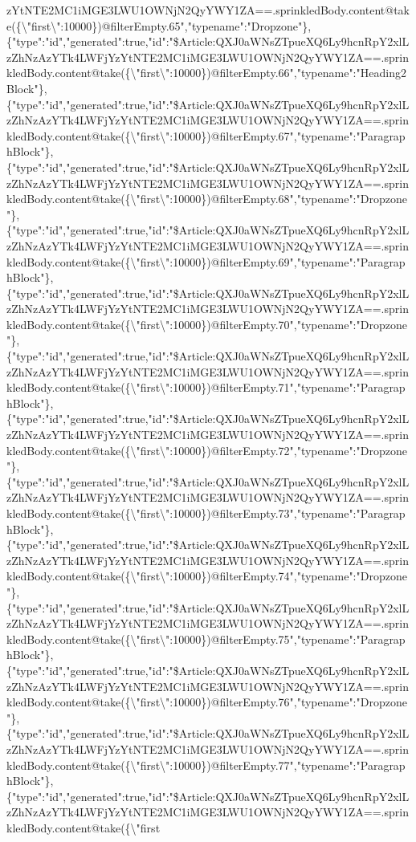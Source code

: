 zYtNTE2MC1iMGE3LWU1OWNjN2QyYWY1ZA==.sprinkledBody.content@take(\{\textbackslash{}"first\textbackslash{}":10000\})@filterEmpty.65","typename":"Dropzone"\},\{"type":"id","generated":true,"id":"\$Article:QXJ0aWNsZTpueXQ6Ly9hcnRpY2xlLzZhNzAzYTk4LWFjYzYtNTE2MC1iMGE3LWU1OWNjN2QyYWY1ZA==.sprinkledBody.content@take(\{\textbackslash{}"first\textbackslash{}":10000\})@filterEmpty.66","typename":"Heading2Block"\},\{"type":"id","generated":true,"id":"\$Article:QXJ0aWNsZTpueXQ6Ly9hcnRpY2xlLzZhNzAzYTk4LWFjYzYtNTE2MC1iMGE3LWU1OWNjN2QyYWY1ZA==.sprinkledBody.content@take(\{\textbackslash{}"first\textbackslash{}":10000\})@filterEmpty.67","typename":"ParagraphBlock"\},\{"type":"id","generated":true,"id":"\$Article:QXJ0aWNsZTpueXQ6Ly9hcnRpY2xlLzZhNzAzYTk4LWFjYzYtNTE2MC1iMGE3LWU1OWNjN2QyYWY1ZA==.sprinkledBody.content@take(\{\textbackslash{}"first\textbackslash{}":10000\})@filterEmpty.68","typename":"Dropzone"\},\{"type":"id","generated":true,"id":"\$Article:QXJ0aWNsZTpueXQ6Ly9hcnRpY2xlLzZhNzAzYTk4LWFjYzYtNTE2MC1iMGE3LWU1OWNjN2QyYWY1ZA==.sprinkledBody.content@take(\{\textbackslash{}"first\textbackslash{}":10000\})@filterEmpty.69","typename":"ParagraphBlock"\},\{"type":"id","generated":true,"id":"\$Article:QXJ0aWNsZTpueXQ6Ly9hcnRpY2xlLzZhNzAzYTk4LWFjYzYtNTE2MC1iMGE3LWU1OWNjN2QyYWY1ZA==.sprinkledBody.content@take(\{\textbackslash{}"first\textbackslash{}":10000\})@filterEmpty.70","typename":"Dropzone"\},\{"type":"id","generated":true,"id":"\$Article:QXJ0aWNsZTpueXQ6Ly9hcnRpY2xlLzZhNzAzYTk4LWFjYzYtNTE2MC1iMGE3LWU1OWNjN2QyYWY1ZA==.sprinkledBody.content@take(\{\textbackslash{}"first\textbackslash{}":10000\})@filterEmpty.71","typename":"ParagraphBlock"\},\{"type":"id","generated":true,"id":"\$Article:QXJ0aWNsZTpueXQ6Ly9hcnRpY2xlLzZhNzAzYTk4LWFjYzYtNTE2MC1iMGE3LWU1OWNjN2QyYWY1ZA==.sprinkledBody.content@take(\{\textbackslash{}"first\textbackslash{}":10000\})@filterEmpty.72","typename":"Dropzone"\},\{"type":"id","generated":true,"id":"\$Article:QXJ0aWNsZTpueXQ6Ly9hcnRpY2xlLzZhNzAzYTk4LWFjYzYtNTE2MC1iMGE3LWU1OWNjN2QyYWY1ZA==.sprinkledBody.content@take(\{\textbackslash{}"first\textbackslash{}":10000\})@filterEmpty.73","typename":"ParagraphBlock"\},\{"type":"id","generated":true,"id":"\$Article:QXJ0aWNsZTpueXQ6Ly9hcnRpY2xlLzZhNzAzYTk4LWFjYzYtNTE2MC1iMGE3LWU1OWNjN2QyYWY1ZA==.sprinkledBody.content@take(\{\textbackslash{}"first\textbackslash{}":10000\})@filterEmpty.74","typename":"Dropzone"\},\{"type":"id","generated":true,"id":"\$Article:QXJ0aWNsZTpueXQ6Ly9hcnRpY2xlLzZhNzAzYTk4LWFjYzYtNTE2MC1iMGE3LWU1OWNjN2QyYWY1ZA==.sprinkledBody.content@take(\{\textbackslash{}"first\textbackslash{}":10000\})@filterEmpty.75","typename":"ParagraphBlock"\},\{"type":"id","generated":true,"id":"\$Article:QXJ0aWNsZTpueXQ6Ly9hcnRpY2xlLzZhNzAzYTk4LWFjYzYtNTE2MC1iMGE3LWU1OWNjN2QyYWY1ZA==.sprinkledBody.content@take(\{\textbackslash{}"first\textbackslash{}":10000\})@filterEmpty.76","typename":"Dropzone"\},\{"type":"id","generated":true,"id":"\$Article:QXJ0aWNsZTpueXQ6Ly9hcnRpY2xlLzZhNzAzYTk4LWFjYzYtNTE2MC1iMGE3LWU1OWNjN2QyYWY1ZA==.sprinkledBody.content@take(\{\textbackslash{}"first\textbackslash{}":10000\})@filterEmpty.77","typename":"ParagraphBlock"\},\{"type":"id","generated":true,"id":"\$Article:QXJ0aWNsZTpueXQ6Ly9hcnRpY2xlLzZhNzAzYTk4LWFjYzYtNTE2MC1iMGE3LWU1OWNjN2QyYWY1ZA==.sprinkledBody.content@take(\{\textbackslash{}"first\textbacks